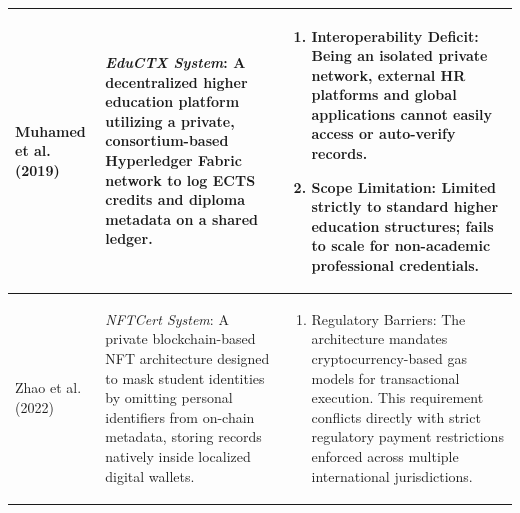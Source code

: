 \begin{longtable}{|m{3.5cm}|m{5cm}|m{5.5cm}|}
    Muhamed et al. (2019) \cite{muhamed2018eductx}                                                                                                                                                                                                                         &
    \textit{EduCTX System}: A decentralized higher education platform utilizing a private, consortium-based Hyperledger Fabric network to log ECTS credits and diploma metadata on a shared ledger.                                                                        &
    \begin{enumerate}[nosep, leftmargin=*]
        \item Interoperability Deficit: Being an isolated private network, external HR platforms and global applications cannot easily access or auto-verify records.
        \item Scope Limitation: Limited strictly to standard higher education structures; fails to scale for non-academic professional credentials.
    \end{enumerate}                                                                                                             \\
    \hline

    Zhao et al. (2022) \cite{xiongfei2022nftcert}                                                                                                                                                                                                                          &
    \textit{NFTCert System}: A private blockchain-based NFT architecture designed to mask student identities by omitting personal identifiers from on-chain metadata, storing records natively inside localized digital wallets.                                           &
    \begin{enumerate}[nosep, leftmargin=*]
        \item Regulatory Barriers: The architecture mandates cryptocurrency-based gas models for transactional execution. This requirement conflicts directly with strict regulatory payment restrictions enforced across multiple international jurisdictions.
    \end{enumerate}                   \\
    \hline


\end{longtable}
